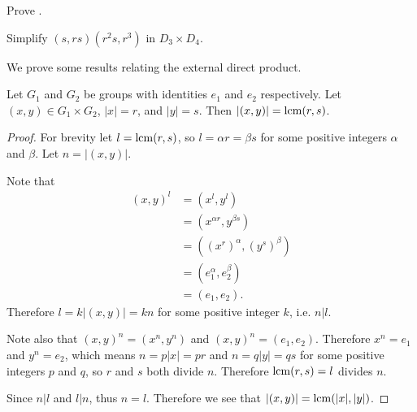 \begin{exercise}\label{exercise-external-direct-product-is-group}
    Prove .
\end{exercise}

\begin{exercise}
    Simplify $(s, rs)(r^2s, r^3)$ in $D_3 \times D_4$.
\end{exercise}

We prove some results relating the external direct product.
\begin{proposition}\label{prop-order-of-element-in-external-direct-product}
    Let $G_1$ and $G_2$ be groups with identities $e_1$ and $e_2$ respectively. Let $(x, y) \in G_1 \times G_2$, $|x| = r$, and $|y| = s$. Then $|(x, y)| = \mathrm{lcm}(r, s)$.
\end{proposition}
\begin{proof}
    For brevity let $l = \mathrm{lcm}(r, s)$, so $l = \alpha r = \beta s$ for some positive integers $\alpha$ and $\beta$. Let $n = |(x, y)|$.

    Note that
    \begin{align*}
        (x, y)^l &= (x^l, y^l)\\
        &= (x^{\alpha r}, y^{\beta s})\\
        &= \left((x^r)^\alpha, (y^s)^\beta\right)\\
        &= (e_1^\alpha, e_2^\beta)\\
        &= (e_1, e_2).
    \end{align*}
    Therefore $l = k|(x, y)| = kn$ for some positive integer $k$, i.e. $n \vert l$.

    Note also that $(x, y)^n = (x^n, y^n)$ and $(x, y)^n = (e_1, e_2)$. Therefore $x^n = e_1$ and $y^n = e_2$, which means $n = p|x| = pr$ and $n = q|y| = qs$ for some positive integers $p$ and $q$, so $r$ and $s$ both divide $n$. Therefore $\mathrm{lcm}(r, s) = l$ divides $n$.

    Since $n \vert l$ and $l \vert n$, thus $n = l$. Therefore we see that $|(x, y)| = \mathrm{lcm}(|x|, |y|)$.
\end{proof}

